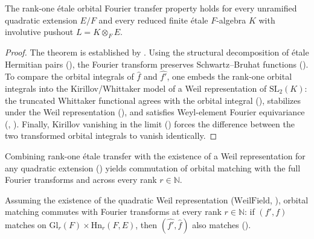 \begin{theorem}
\label{thm:ch03-rank-one-transfer}
The rank-one \'etale orbital Fourier transfer property
 holds for every unramified quadratic
extension $E/F$ and every reduced finite \'etale $F$-algebra $K$ with
involutive pushout $L = K \otimes_F E$.
\end{theorem}

\begin{proof}
The theorem is established by .
Using the structural decomposition of \'etale Hermitian pairs
(), the Fourier
transform preserves Schwartz--Bruhat functions
().
To compare the orbital integrals of $\widehat{f}$ and $\widehat{f'}$, one
embeds the rank-one orbital integrals into the Kirillov/Whittaker model of a
Weil representation of $\mathrm{SL}_2(K)$: the truncated Whittaker functional
agrees with the orbital integral
(),
stabilizes under the Weil representation
(), and
satisfies Weyl-element Fourier equivariance
(,
).
Finally, Kirillov vanishing in the limit
() forces the difference
between the two transformed orbital integrals to vanish identically.
\end{proof}

Combining rank-one \'etale transfer with the existence of a Weil representation
for any quadratic extension () yields
commutation of orbital matching with the full Fourier transforms
 and  across
every rank $r \in \mathbb{N}$.

\begin{theorem}
\label{thm:ch03-fourier-match}
Assuming the existence of the quadratic Weil representation ($\mathrm{WeilField}$,
), orbital matching commutes with Fourier
transforms at every rank $r \in \mathbb{N}$: if $(f', f)$ matches on
$\mathrm{Gl}_r(F) \times \mathrm{Hn}_r(F, E)$, then $(\widehat{f'}, \widehat{f})$
also matches ().
\end{theorem}

